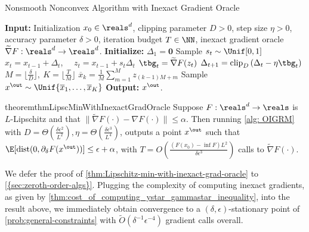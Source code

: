 \begin{algorithm}[h]
\begin{algorithmic}[1]\caption{Nonsmooth Nonconvex Algorithm with Inexact Gradient Oracle}\label{alg: OIGRM}
\State \textbf{Input:}
Initialization $x_0\in\reals^d$, clipping parameter $D>0$,
step size $\eta>0$,
accuracy parameter $\delta>0$,
iteration budget $T\in\NN$, inexact gradient oracle $\widetilde{\nabla}F:\reals^d\to\reals^d$.
\State \textbf{Initialize:} ${\Delta}_1=\mathbf{0}$
\State Sample $s_t\sim\Unif[0,1]$ 
\State $x_t=x_{t-1}+{\Delta}_t$, ~~$z_t=x_{t-1}+s_t{\Delta}_t$
\State $\tbg_t=\widetilde{\nabla}F(z_t)$
\State ${\Delta}_{t+1}
=\mathrm{clip}_{D}\left({\Delta}_t-\eta\tbg_t\right) 
$
\EndFor
\State $M=\lfloor\frac{\delta}{D}\rfloor,~K=\lfloor\frac{T}{M}\rfloor$
\State $\overline{x}_{k}=\frac{1}{M}\sum_{m=1}^{M} z_{(k-1)M+m}$
\EndFor
\State Sample $ x^{\out}\sim\Unif\{\overline{ x}_1,\dots,\overline{ x}_{K}\}$
\State \textbf{Output:} $ x^{\out}$. 
\end{algorithmic}
\end{algorithm}


\begin{restatable}{theorem}{thmLipscMinWithInexactGradOracle}\label{thm:Lipschitz-min-with-inexact-grad-oracle}
Suppose $F:\reals^d\to\reals$ is $L$-Lipschitz  
and that $\|\widetilde{\nabla} F(\cdot)-\nabla F(\cdot)\|\leq\alpha$. 
Then running \cref{alg: OIGRM} with
$D=\Theta(\frac{\delta\epsilon^2}{L^2}),\eta=\Theta(\frac{\delta\epsilon^3}{L^4})$,
outputs a point $x^{\out}$ such that $\E[\mathrm{dist}(0,{\partial}_\delta F(x^{\out}))]\leq\epsilon+\alpha$, with
$T=O\left(\frac{(F(x_0)-\inf F) L^2}{\delta\epsilon^3}\right)$
calls to $\widetilde{\nabla}F(\cdot)$.
\end{restatable}

We defer the proof of \cref{thm:Lipschitz-min-with-inexact-grad-oracle} to \cref{{sec:zeroth-order-algs}}.
Plugging the complexity of computing inexact gradients,
as given by \cref{thm:cost_of_computing_ystar_gammastar_inequality},
into the result above,
we immediately obtain convergence to a $(\delta,\epsilon)$-stationary point of \cref{prob:general-constraints} with $\widetilde{O}(\delta^{-1}\epsilon^{-4})$ gradient calls overall.




